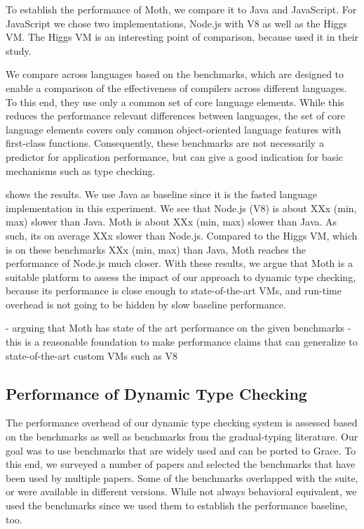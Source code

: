 To establish the performance of Moth,
we compare it to Java and JavaScript.
For JavaScript we chose two implementations,
Node.js with V8 as well as the Higgs VM.
The Higgs VM is an interesting point of comparison,
because \citet{Richards2017} used it in their study.

We compare across languages based on the \AWFY benchmarks\citep{Marr2016},
which are designed to enable a comparison
of the effectiveness of compilers across different languages.
To this end, they use only a common set of core language elements.
While this reduces the performance relevant differences between languages,
the set of core language elements covers only common object-oriented language
features with first-class functions.
Consequently, these benchmarks are not necessarily a predictor
for application performance,
but can give a good indication for basic mechanisms such as type checking.

 shows the results.
We use Java as baseline since it is the fasted language implementation
in this experiment.
We see that Node.js (V8) is about XXx (min, max) slower than Java.
Moth is about XXx (min, max) slower than Java.
As such, its on average XXx slower than Node.js.
Compared to the Higgs VM, which is on these benchmarks
XXx (min, max) than Java,
Moth reaches the performance of Node.js much closer.
With these results, we argue that Moth is a suitable platform to
assess the impact of our approach to dynamic type checking,
because its performance is close enough to state-of-the-art VMs,
and run-time overhead is not going to be hidden by slow baseline performance.

\begin{cnote}
- arguing that Moth has state of the art performance on the given benchmarks
- this is a reasonable foundation to make performance claims
  that can generalize to state-of-the-art custom VMs such as V8
\end{cnote}

\subsection{Performance of Dynamic Type Checking}

The performance overhead of our dynamic type checking system
is assessed based on the \AWFY benchmarks
as well as benchmarks from the gradual-typing literature.
Our goal was to use benchmarks that are widely used and can be ported to Grace.
To this end, we surveyed a number of papers\citep{Takikawa2016,Vitousek2017,Muehlboeck2017,Bauman2017,Richards2017,Stulova2016,Greenman2018}
and selected the benchmarks that have been used by multiple papers.
Some of the benchmarks overlapped with the \AWFY suite,
or were available in different versions.
While not always behavioral equivalent,
we used the \AWFY benchmarks since we used them to
establish the performance baseline, too.

